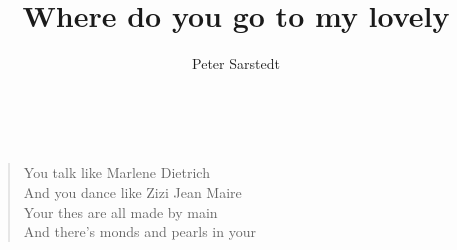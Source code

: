 \documentclass[9pt,a4paper,oneside, onecolumn]{article}
\author{Peter Sarstedt}
\title{Where do you go to my lovely}
\date{}
\begin{document}
\maketitle
\thispagestyle{empty}

\mbox{
}\\


\begin{verse}
You talk like Marlene Dietrich \\
And you dance like Zizi Jean Maire \\
Your thes are all made by main \\
And there's monds and pearls in your \qquad {}\qquad{} \\
\end{verse}
\end{document}
